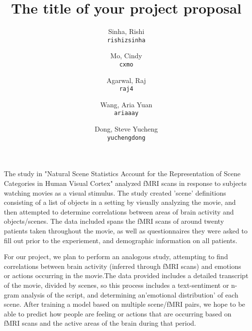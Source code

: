 \documentclass[11pt]{article}
\title{The title of your project proposal}
\author{
  Sinha, Rishi\\
  \texttt{rishizsinha}
  \and
  Mo, Cindy\\
  \texttt{cxmo}
  \and
  Agarwal, Raj\\
  \texttt{raj4}
  \and
  Wang, Aria Yuan\\
  \texttt{ariaaay}
  \and
  Dong, Steve Yucheng\\
  \texttt{yuchengdong}
}
\begin{document}
\maketitle

The study in "Natural Scene Statistics Account for the Representation of 
Scene Categories in Human Visual Cortex"\cite{stansbury2013neuron} analyzed 
fMRI scans in response to subjects watching movies as a visual stimulus.
The study created 'scene' definitions consisting of a list of objects in 
a setting by visually analyzing the movie, and then attempted to determine 
correlations between areas of brain activity and objects/scenes. The data 
included spans the fMRI scans of around twenty patients taken throughout
the movie, as well as questionnaires they were asked to fill out prior
to the experiement, and demographic information on all patients.

For our project, we plan to perform an analogous study, attempting to find
correlations between brain activity (inferred through fMRI scans) and 
emotions or actions occurring in the movie.The data provided includes 
a detailed transcript of the movie, divided by scenes, so this process 
includes a text-sentiment or n-gram analysis of the script, and determining 
an'emotional distribution' of each scene. After training a model based on
multiple scene/fMRI pairs, we hope to be able to predict how people are 
feeling or actions that are occurring based on fMRI scans and the active 
areas of the brain during that period. 


\end{document}
